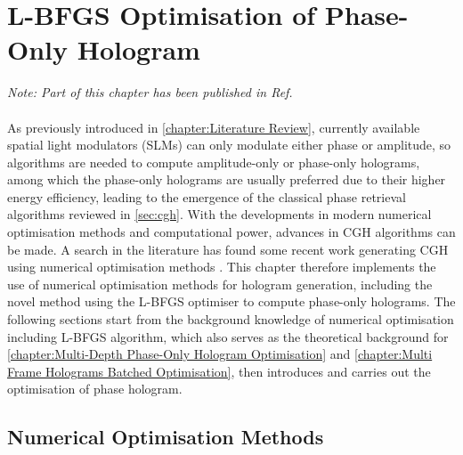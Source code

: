 \chapter{L-BFGS Optimisation of Phase-Only Hologram}
\label{chapter:L-BFGS Optimisation of Phase-Only Hologram}

\graphicspath{{Chapter_Optim_CGH/Figs/}}

\textit{Note: Part of this chapter has been published in Ref. \cite{Sha2022}}\\\\


As previously introduced in \cref{chapter:Literature Review}, currently available spatial light modulators (SLMs) can only modulate either phase or amplitude, so algorithms are needed to compute amplitude-only or phase-only holograms, among which the phase-only holograms are usually preferred due to their higher energy efficiency, leading to the emergence of the classical phase retrieval algorithms reviewed in \cref{sec:cgh}. With the developments in modern numerical optimisation methods and computational power, advances in CGH algorithms can be made. A search in the literature has found some recent work generating CGH using numerical optimisation methods \cite{Zhang2017, Liu2020, Choi2021, Chen2021}. This chapter therefore implements the use of numerical optimisation methods for hologram generation, including the novel method using the L-BFGS optimiser to compute phase-only holograms. The following sections start from the background knowledge of numerical optimisation including L-BFGS algorithm, which also serves as the theoretical background for \cref{chapter:Multi-Depth Phase-Only Hologram Optimisation} and \cref{chapter:Multi Frame Holograms Batched Optimisation}, then introduces and carries out the optimisation of phase hologram.



\section{Numerical Optimisation Methods} \label{sec:Numerical Optimisation Methods}

